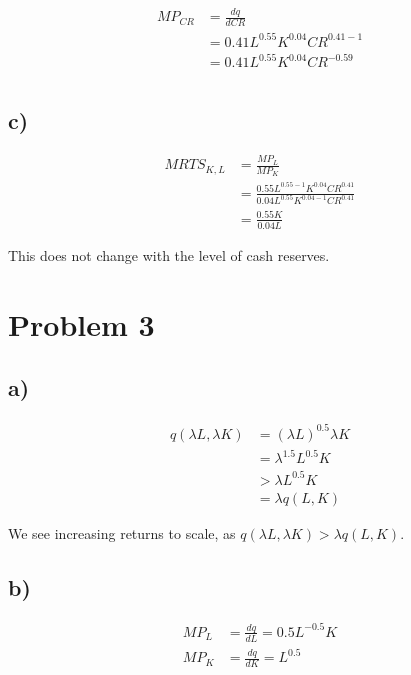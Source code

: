 \documentclass[12pt,letterpaper]{article}
\theoremstyle{definition}
\begin{document}
\begin{align*}
  MP_{CR} &= \frac{dq}{dCR} \\
          &= 0.41L^{0.55}K^{0.04}CR^{0.41-1} \\
          &= 0.41L^{0.55}K^{0.04}CR^{-0.59} \\
\end{align*}

\subsection*{c)}

\begin{align*}
  MRTS_{K,L} &= \frac{MP_L}{MP_K} \\
             &= \frac{0.55L^{0.55-1}K^{0.04}CR^{0.41}}{0.04L^{0.55}K^{0.04-1}CR^{0.41}} \\
             &= \frac{0.55K}{0.04L}
\end{align*}

This does not change with the level of cash reserves.

\section*{Problem 3}

\subsection*{a)}

\begin{align*}
  q(\lambda L,\lambda K) &= (\lambda L)^{0.5}\lambda K \\
                         &= \lambda^{1.5}L^{0.5}K \\
                         &> \lambda L^{0.5}K \\
                         &= \lambda q(L,K)
\end{align*}

We see increasing returns to scale, as $q(\lambda L,\lambda K) > \lambda q(L,K)$.

\subsection*{b)}

\begin{align*}
  MP_L &= \frac{dq}{dL} = 0.5L^{-0.5}K \\
  MP_K &= \frac{dq}{dK} = L^{0.5}
\end{align*}
\end{document}
